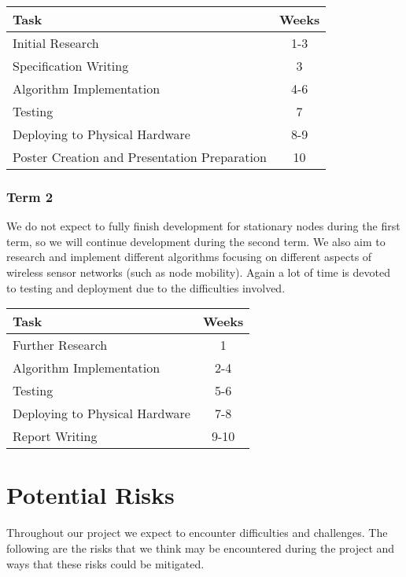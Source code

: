 \documentclass[a4paper]{article}
\begin{document}
\begin{table}[H]
	\centering
	\begin{tabular}{| l | c |}
	\hline
	\textbf{Task} & \textbf{Weeks}\\
	\hline
	Initial Research & 1-3\\
	\hline
	Specification Writing & 3\\
	\hline
	Algorithm Implementation & 4-6\\
	\hline
	Testing & 7\\
	\hline
	Deploying to Physical Hardware & 8-9\\
	\hline
	Poster Creation and Presentation Preparation & 10\\
	\hline
	\end{tabular}
\end{table}

\subsubsection{Term 2}

We do not expect to fully finish development for stationary nodes during the first term, so we will continue development during the second term. We also aim to research and implement different algorithms focusing on different aspects of wireless sensor networks (such as node mobility). Again a lot of time is devoted to testing and deployment due to the difficulties involved.

\begin{table}[H]
	\centering
	\begin{tabular}{| l | c |}
	\hline
	\textbf{Task} & \textbf{Weeks}\\
	\hline
	Further Research & 1\\
	\hline
	Algorithm Implementation & 2-4\\
	\hline
	Testing & 5-6\\
	\hline
	Deploying to Physical Hardware & 7-8\\
	\hline
	Report Writing & 9-10\\
	\hline
	\end{tabular}
\end{table}



\section{Potential Risks}

Throughout our project we expect to encounter difficulties and challenges. The following are the risks that we think may be encountered during the project and ways that these risks could be mitigated.
\end{document}

